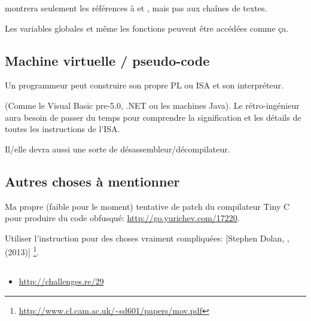 \IDA{} montrera seulement les références à  et ,
mais pas aux chaînes de textes.

Les variables globales et même les fonctions peuvent être accédées comme ça.

\subsection{Machine virtuelle / pseudo-code}

Un programmeur peut construire son propre \ac{PL} ou \ac{ISA} et son interpréteur.

(Comme le Visual Basic pre-5.0, .NET ou les machines Java).
Le rétro-ingénieur aura besoin de passer du temps pour comprendre la signification
et les détails de toutes les instructions de l'\ac{ISA}.

Il/elle devra aussi une sorte de désassembleur/décompilateur.

\subsection{Autres choses à mentionner}

Ma propre (faible pour le moment) tentative de patch du compilateur Tiny C pour
produire du code obfusqué: \url{http://go.yurichev.com/17220}.

Utiliser l'instruction \MOV pour des choses vraiment compliquées:
[Stephen Dolan, , (2013)]
\footnote{\AlsoAvailableAs \url{http://www.cl.cam.ac.uk/~sd601/papers/mov.pdf}}. 

\subsection{\Exercise}

\begin{itemize}
	\item \url{http://challenges.re/29}
\end{itemize}

